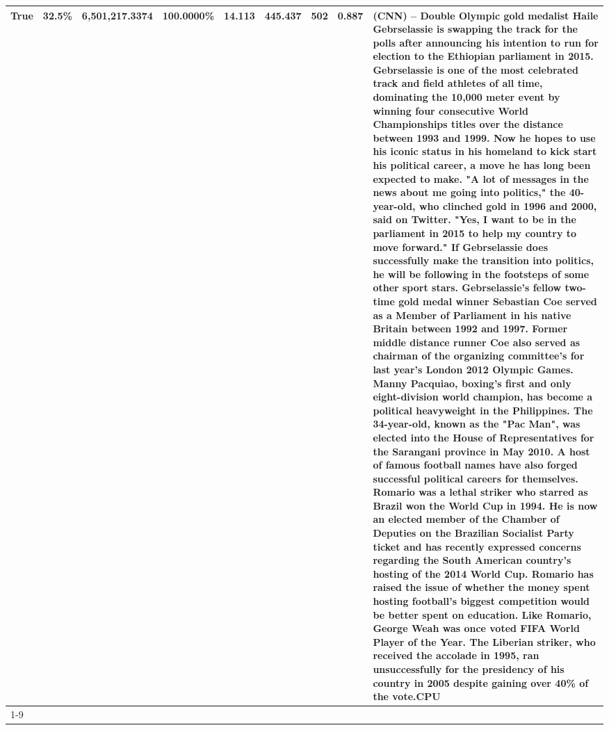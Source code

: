 \begin{table}[H]
{\begin{tabular}{lllrlllll}
True & 32.5\% & 6,501,217.3374 & \bfseries \color{red} 100.0000\% & 14.113 & 445.437 & 502 & 0.887 & (CNN) -- Double Olympic gold medalist Haile Gebrselassie is swapping the track for the polls after announcing his intention to run for election to the Ethiopian parliament in 2015. Gebrselassie is one of the most celebrated track and field athletes of all time, dominating the 10,000 meter event by winning four consecutive World Championships titles over the distance between 1993 and 1999. Now he hopes to use his iconic status in his homeland to kick start his political career, a move he has long been expected to make. "A lot of messages in the news about me going into politics," the 40-year-old, who clinched gold in 1996 and 2000, said on Twitter. "Yes, I want to be in the parliament in 2015 to help my country to move forward." If Gebrselassie does successfully make the transition into politics, he will be following in the footsteps of some other sport stars. Gebrselassie's fellow two-time gold medal winner Sebastian Coe served as a Member of Parliament in his native Britain between 1992 and 1997. Former middle distance runner Coe also served as chairman of the organizing committee's for last year's London 2012 Olympic Games. Manny Pacquiao, boxing's first and only eight-division world champion, has become a political heavyweight in the Philippines. The 34-year-old, known as the "Pac Man", was elected into the House of Representatives for the Sarangani province in May 2010. A host of famous football names have also forged successful political careers for themselves. Romario was a lethal striker who starred as Brazil won the World Cup in 1994. He is now an elected member of the Chamber of Deputies on the Brazilian Socialist Party ticket and has recently expressed concerns regarding the South American country's hosting of the 2014 World Cup. Romario has raised the issue of whether the money spent hosting football's biggest competition would be better spent on education. Like Romario, George Weah was once voted FIFA World Player of the Year. The Liberian striker, who received the accolade in 1995, ran unsuccessfully for the presidency of his country in 2005 despite gaining over 40\% of the vote.CPU \\
\cline{1-9}

\end{tabular}}
\end{table}
